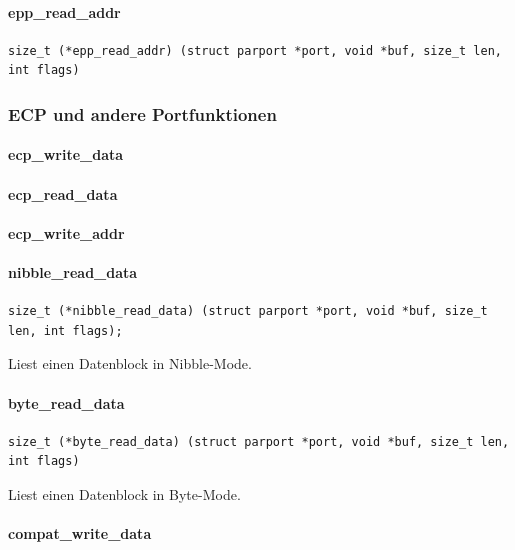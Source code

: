 \documentclass[a4paper,11pt]{article}
\begin{document}
\paragraph{epp\_read\_addr}
\begin{verbatim}
size_t (*epp_read_addr) (struct parport *port, void *buf, size_t len, int flags)
\end{verbatim}


\subsubsection{ECP und andere Portfunktionen}

\paragraph{ecp\_write\_data}

\paragraph{ecp\_read\_data}

\paragraph{ecp\_write\_addr}

\paragraph{nibble\_read\_data}

\begin{verbatim}
size_t (*nibble_read_data) (struct parport *port, void *buf, size_t len, int flags);
\end{verbatim}

Liest einen Datenblock in Nibble-Mode.

\paragraph{byte\_read\_data}

\begin{verbatim}
size_t (*byte_read_data) (struct parport *port, void *buf, size_t len, int flags)
\end{verbatim}

Liest einen Datenblock in Byte-Mode.

\paragraph{compat\_write\_data}
\end{document}
